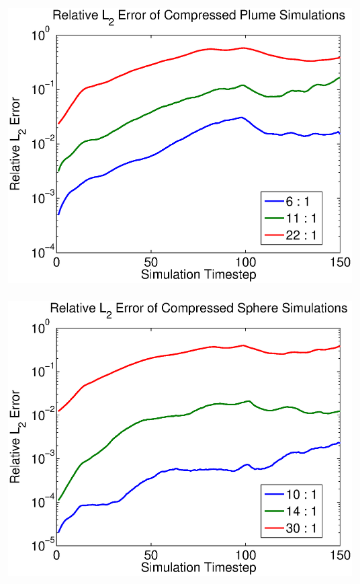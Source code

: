 \begin{figure}
\centering
  \begin{subfigure}[b]{0.3\textwidth}
    \includegraphics[width=\textwidth]{chap4/figures/plumeError}
    \label{fig:plumeError}
  \end{subfigure}
   \begin{subfigure}[b]{0.3\textwidth}
    \includegraphics[width=\textwidth]{chap4/figures/sphereError}
    \label{fig:sphereError}
    \end{subfigure}

\end{figure}
